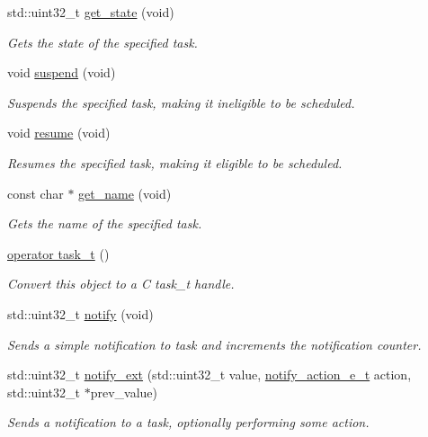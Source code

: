 \begin{DoxyCompactItemize}
std\+::uint32\+\_\+t \hyperlink{classpros_1_1Task_a45f0b63eec57e7fe8adf3876988588bf}{get\+\_\+state} (void)
\begin{DoxyCompactList}\small\item\em Gets the state of the specified task. \end{DoxyCompactList}\item 
void \hyperlink{classpros_1_1Task_a89005762dcd3026c953ae5eedd7ecd97}{suspend} (void)
\begin{DoxyCompactList}\small\item\em Suspends the specified task, making it ineligible to be scheduled. \end{DoxyCompactList}\item 
void \hyperlink{classpros_1_1Task_ada2c08d04b39f11582cea90b59b8f317}{resume} (void)
\begin{DoxyCompactList}\small\item\em Resumes the specified task, making it eligible to be scheduled. \end{DoxyCompactList}\item 
const char $\ast$ \hyperlink{classpros_1_1Task_a3c559d11cf602b99fc870b8be43fe191}{get\+\_\+name} (void)
\begin{DoxyCompactList}\small\item\em Gets the name of the specified task. \end{DoxyCompactList}\item 
\hyperlink{classpros_1_1Task_a16c15efcec74a76b6848fc999ff0c232}{operator task\+\_\+t} ()
\begin{DoxyCompactList}\small\item\em Convert this object to a C task\+\_\+t handle. \end{DoxyCompactList}\item 
std\+::uint32\+\_\+t \hyperlink{classpros_1_1Task_ad376e3065701ba4853d4be1c90c0544c}{notify} (void)
\begin{DoxyCompactList}\small\item\em Sends a simple notification to task and increments the notification counter. \end{DoxyCompactList}\item 
std\+::uint32\+\_\+t \hyperlink{classpros_1_1Task_add5bc6272aaa903fdf8ae6656d8ffddb}{notify\+\_\+ext} (std\+::uint32\+\_\+t value, \hyperlink{rtos_8h_a42ea99b5e5d38da0b98154609cf6c570}{notify\+\_\+action\+\_\+e\+\_\+t} action, std\+::uint32\+\_\+t $\ast$prev\+\_\+value)
\begin{DoxyCompactList}\small\item\em Sends a notification to a task, optionally performing some action. \end{DoxyCompactList}\item 

\end{DoxyCompactItemize}
